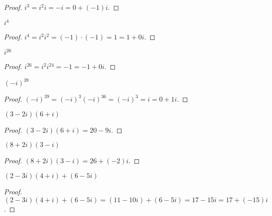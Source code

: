 \begin{proof}
    $i^{3} = {i}^{2}i = -i = 0 + (-1)i$.
\end{proof}

\newpage
\begin{exercise}
    $i^{4}$
\end{exercise}

\begin{proof}
    $i^{4} = {i}^{2}{i}^{2} = (-1)\cdot (-1) = 1 = 1 + 0i$.
\end{proof}

\newpage
\begin{exercise}
    $i^{26}$
\end{exercise}

\begin{proof}
    $i^{26} = {i}^{2}{i}^{24} = -1 = -1 + 0i$.
\end{proof}

\newpage
\begin{exercise}
    ${(-i)}^{39}$
\end{exercise}

\begin{proof}
    ${(-i)}^{39} = {(-i)}^{3}{(-i)}^{36} = {(-i)}^{3} = i = 0 + 1i$.
\end{proof}

\newpage
\begin{exercise}
    $(3 - 2i)(6 + i)$
\end{exercise}

\begin{proof}
    $(3 - 2i)(6 + i) = 20 - 9i$.
\end{proof}

\newpage
\begin{exercise}
    $(8 + 2i)(3 - i)$
\end{exercise}

\begin{proof}
    $(8 + 2i)(3 - i) = 26 + (-2)i$.
\end{proof}

\newpage
\begin{exercise}
    $(2 - 3i)(4 + i) + (6 - 5i)$
\end{exercise}

\begin{proof}
    $(2 - 3i)(4 + i) + (6 - 5i) = (11 - 10i) + (6 - 5i) = 17 - 15i = 17 + (-15)i$.
\end{proof}

